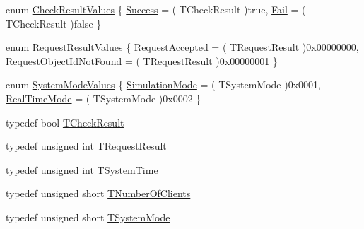 \begin{DoxyCompactItemize}
\item 
enum \hyperlink{class_terra_swarm_1_1_asynchronous_1_1_client_connection_response_a6ca5be4e8bbd731c78f132f1c36513ab}{Check\-Result\-Values} \{ \hyperlink{class_terra_swarm_1_1_asynchronous_1_1_client_connection_response_a6ca5be4e8bbd731c78f132f1c36513abab6f5e3d2684a7900eaf26759bca7985a}{Success} = ( T\-Check\-Result )true, 
\hyperlink{class_terra_swarm_1_1_asynchronous_1_1_client_connection_response_a6ca5be4e8bbd731c78f132f1c36513aba3e6ded9f7aac9629d82cf4c50d232cf0}{Fail} = ( T\-Check\-Result )false
 \}
\item 
enum \hyperlink{class_terra_swarm_1_1_asynchronous_1_1_client_connection_response_a0ebeb46e785ebdd94d1b7e2c9bad80e8}{Request\-Result\-Values} \{ \hyperlink{class_terra_swarm_1_1_asynchronous_1_1_client_connection_response_a0ebeb46e785ebdd94d1b7e2c9bad80e8a81d9cf33ed428b0b13e67f28fc7aca73}{Request\-Accepted} = ( T\-Request\-Result )0x00000000, 
\hyperlink{class_terra_swarm_1_1_asynchronous_1_1_client_connection_response_a0ebeb46e785ebdd94d1b7e2c9bad80e8aea62f4e9889f66d001662d6fa7bea4eb}{Request\-Object\-Id\-Not\-Found} = ( T\-Request\-Result )0x00000001
 \}
\item 
enum \hyperlink{class_terra_swarm_1_1_asynchronous_1_1_client_connection_response_a980f1fa3c9f50c7013f2c2f2d7d6043c}{System\-Mode\-Values} \{ \hyperlink{class_terra_swarm_1_1_asynchronous_1_1_client_connection_response_a980f1fa3c9f50c7013f2c2f2d7d6043ca5d65d9ac052a2eb8917de303ebbeb913}{Simulation\-Mode} = ( T\-System\-Mode )0x0001, 
\hyperlink{class_terra_swarm_1_1_asynchronous_1_1_client_connection_response_a980f1fa3c9f50c7013f2c2f2d7d6043cadc0d1643e730abaef6c00b5cb62005e9}{Real\-Time\-Mode} = ( T\-System\-Mode )0x0002
 \}
\item 
typedef bool \hyperlink{class_terra_swarm_1_1_asynchronous_1_1_client_connection_response_aee00184a039b2aebfcefd9d5b5b71c89}{T\-Check\-Result}
\item 
typedef unsigned int \hyperlink{class_terra_swarm_1_1_asynchronous_1_1_client_connection_response_a55a4d4527b877bde0e74da223157a62a}{T\-Request\-Result}
\item 
typedef unsigned int \hyperlink{class_terra_swarm_1_1_asynchronous_1_1_client_connection_response_ac32ae5e652874b024aae5ed2f816c155}{T\-System\-Time}
\item 
typedef unsigned short \hyperlink{class_terra_swarm_1_1_asynchronous_1_1_client_connection_response_a0780de58d62395a3cce207fe96e43ccc}{T\-Number\-Of\-Clients}
\item 
typedef unsigned short \hyperlink{class_terra_swarm_1_1_asynchronous_1_1_client_connection_response_ac34facba96c97e6897a1abd5ddd09159}{T\-System\-Mode}
\end{DoxyCompactItemize}
